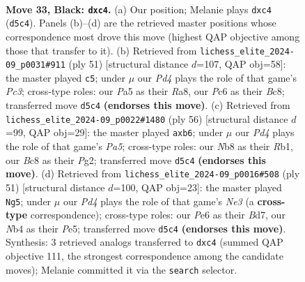 \documentclass[11pt]{article}
\begin{document}
\clearpage

\begin{figure}[p]\centering
\begin{subfigure}{0.46\textwidth}\centering
\resizebox{\linewidth}{!}{%
\newchessgame
\chessboard[
  setfen={rnb5/1p4kr/2pqp3/p2p1p1p/PnPP1P1N/6P1/1P1QB1KP/1N2R2R b - - 0 33},
  showmover=false,
  pgfstyle=straightmove, color=movearrow, markmove={d5-c4}
]}
\caption{}
\end{subfigure}\hfill
\begin{subfigure}{0.46\textwidth}\centering
\resizebox{\linewidth}{!}{%
\newchessgame
\chessboard[
  setfen={r1b1k1r1/1p2pp2/2pp1n1p/1q1P4/p2QP1pN/2P3B1/5KPP/4R2R b q - 1 26},
  showmover=false,
  pgfstyle=straightmove, color=movearrow, markmove={c6-c5}
]}
\caption{}
\end{subfigure}
\\[4pt]
\begin{subfigure}{0.46\textwidth}\centering
\resizebox{\linewidth}{!}{%
\newchessgame
\chessboard[
  setfen={n1rqr1k1/6p1/pp1p3p/P2Pp3/bPP1Pp2/NN1Q3P/5RP1/1R4K1 w - - 2 29},
  showmover=false,
  pgfstyle=straightmove, color=movearrow, markmove={a5-b6}
]}
\caption{}
\end{subfigure}\hfill
\begin{subfigure}{0.46\textwidth}\centering
\resizebox{\linewidth}{!}{%
\newchessgame
\chessboard[
  setfen={r4rk1/2qb2p1/2p1np1p/pp1Pp2n/4P2B/P1P1QN2/1PB3PP/3R1R1K b - - 0 26},
  showmover=false,
  pgfstyle=straightmove, color=movearrow, markmove={e6-g5}
]}
\caption{}
\end{subfigure}
\caption{\textbf{Move 33, Black: \texttt{dxc4}.} (a) Our position; Melanie plays \texttt{dxc4} (\texttt{d5c4}). Panels (b)--(d) are the retrieved master positions whose correspondence most drove this move (highest QAP objective among those that transfer to it). (b) Retrieved from \texttt{lichess\_elite\_2024-09\_p0031\#911} (ply 51) [structural distance $d$=107, QAP obj=58]: the master played \texttt{c5}; under $\mu$ our \emph{Pd4} plays the role of that game's \emph{Pc3}; cross-type roles: our \emph{P}a5 as their \emph{R}a8, our \emph{P}c6 as their \emph{B}c8; transferred move \texttt{d5c4} \textbf{(endorses this move)}. (c) Retrieved from \texttt{lichess\_elite\_2024-09\_p0022\#1480} (ply 56) [structural distance $d$=99, QAP obj=29]: the master played \texttt{axb6}; under $\mu$ our \emph{Pd4} plays the role of that game's \emph{Pa5}; cross-type roles: our \emph{N}b8 as their \emph{R}b1, our \emph{B}c8 as their \emph{P}g2; transferred move \texttt{d5c4} \textbf{(endorses this move)}. (d) Retrieved from \texttt{lichess\_elite\_2024-09\_p0016\#508} (ply 51) [structural distance $d$=100, QAP obj=23]: the master played \texttt{Ng5}; under $\mu$ our \emph{Pd4} plays the role of that game's \emph{Ne3} (a \textbf{cross-type} correspondence); cross-type roles: our \emph{P}e6 as their \emph{B}d7, our \emph{N}b4 as their \emph{P}e5; transferred move \texttt{d5c4} \textbf{(endorses this move)}. Synthesis: 3 retrieved analogs transferred to \texttt{dxc4} (summed QAP objective 111, the strongest correspondence among the candidate moves); Melanie committed it via the \texttt{search} selector.}
\label{fig:thought-m65}
\end{figure}
\end{document}
